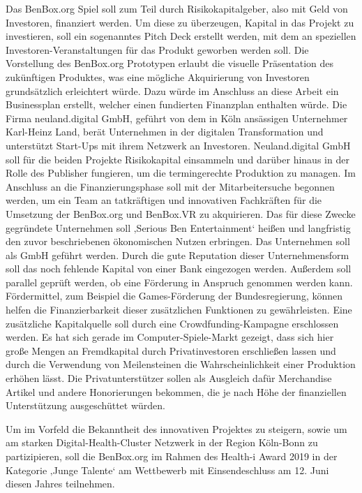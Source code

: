 \documentclass[
  a4paper,
  DIV=11,
  numbers=noendperiod,
  onecolumn,
  oneside,
  a4paper]{scrartcl}
\begin{document}
Das BenBox.org Spiel soll zum Teil durch Risikokapitalgeber, also mit
Geld von Investoren, finanziert werden. Um diese zu überzeugen, Kapital
in das Projekt zu investieren, soll ein sogenanntes Pitch Deck erstellt
werden, mit dem an speziellen Investoren-Veranstaltungen für das Produkt
geworben werden soll. Die Vorstellung des BenBox.org Prototypen erlaubt
die visuelle Präsentation des zukünftigen Produktes, was eine mögliche
Akquirierung von Investoren grundsätzlich erleichtert würde. Dazu würde
im Anschluss an diese Arbeit ein Businessplan erstellt, welcher einen
fundierten Finanzplan enthalten würde. Die Firma neuland.digital GmbH,
geführt von dem in Köln ansässigen Unternehmer Karl-Heinz Land, berät
Unternehmen in der digitalen Transformation und unterstützt Start-Ups
mit ihrem Netzwerk an Investoren. Neuland.digital GmbH soll für die
beiden Projekte Risikokapital einsammeln und darüber hinaus in der Rolle
des Publisher fungieren, um die termingerechte Produktion zu managen. Im
Anschluss an die Finanzierungsphase soll mit der Mitarbeitersuche
begonnen werden, um ein Team an tatkräftigen und innovativen Fachkräften
für die Umsetzung der BenBox.org und BenBox.VR zu akquirieren. Das für
diese Zwecke gegründete Unternehmen soll ‚Serious Ben Entertainment`
heißen und langfristig den zuvor beschriebenen ökonomischen Nutzen
erbringen. Das Unternehmen soll als GmbH geführt werden. Durch die gute
Reputation dieser Unternehmensform soll das noch fehlende Kapital von
einer Bank eingezogen werden. Außerdem soll parallel geprüft werden, ob
eine Förderung in Anspruch genommen werden kann. Fördermittel, zum
Beispiel die Games-Förderung der Bundesregierung, können helfen die
Finanzierbarkeit dieser zusätzlichen Funktionen zu gewährleisten. Eine
zusätzliche Kapitalquelle soll durch eine Crowdfunding-Kampagne
erschlossen werden. Es hat sich gerade im Computer-Spiele-Markt gezeigt,
dass sich hier große Mengen an Fremdkapital durch Privatinvestoren
erschließen lassen und durch die Verwendung von Meilensteinen die
Wahrscheinlichkeit einer Produktion erhöhen lässt. Die
Privatunterstützer sollen als Ausgleich dafür Merchandise Artikel und
andere Honorierungen bekommen, die je nach Höhe der finanziellen
Unterstützung ausgeschüttet würden.

Um im Vorfeld die Bekanntheit des innovativen Projektes zu steigern,
sowie um am starken Digital-Health-Cluster Netzwerk in der Region
Köln-Bonn zu partizipieren, soll die BenBox.org im Rahmen des Health-i
Award 2019 in der Kategorie ‚Junge Talente` am Wettbewerb mit
Einsendeschluss am 12. Juni diesen Jahres teilnehmen.
\end{document}
